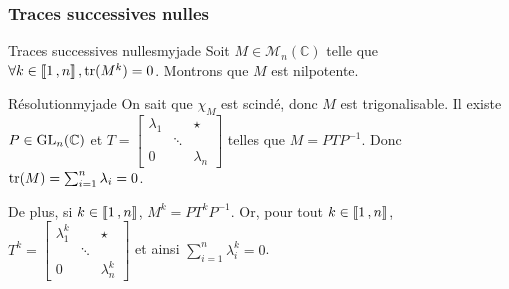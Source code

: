     \subsubsection{Traces successives nulles}

    \begin{omed}{Traces successives nulles}{myjade}
        Soit $M \in \mathcal{M}_n(\mathbb{C})$ telle que $\forall k \in \left\llbracket 1 \, , n \right\rrbracket, \operatorname{tr}(M^k) = 0$. Montrons que $M$ est nilpotente.
    \end{omed}

    \begin{demo}{Résolution}{myjade}
        On sait que $\chi_M$ est scindé, donc $M$ est trigonalisable. Il existe $P \in \operatorname{GL}_n(\mathbb{C})$ et $T = \begin{bmatrix}
            \lambda_1 & & \star \\
             & \ddots & \\
            0 & & \lambda_n
        \end{bmatrix}$ telles que $M = P T P^{-1}$. Donc $\operatorname{tr}(M) = \sum_{i=1}^{n} \lambda_i = 0$.

        De plus, si $k \in \left\llbracket 1 \, , n \right\rrbracket$, $M^k = P T^k P^{-1}$. Or, pour tout $k \in \left\llbracket 1 \, , n \right\rrbracket$, $T^k = \begin{bmatrix}
            \lambda_1^k & & \star \\
             & \ddots & \\
            0 & & \lambda_n^k
        \end{bmatrix}$ et ainsi $\sum_{i=1}^{n} \lambda_i^k = 0$.


\end{demo}
